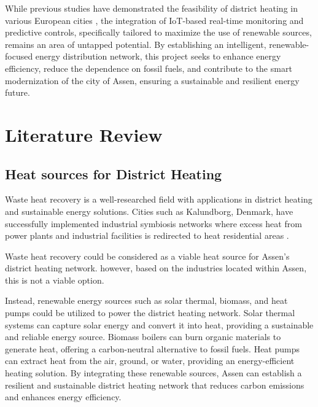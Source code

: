 \documentclass[conference]{IEEEtran}
\begin{document}
While previous studies have demonstrated the feasibility of district heating in various European cities \cite{kalundborg}, the integration of IoT-based real-time monitoring and predictive controls, specifically tailored to maximize the use of renewable sources, remains an area of untapped potential. By establishing an intelligent, renewable-focused energy distribution network, this project seeks to enhance energy efficiency, reduce the dependence on fossil fuels, and contribute to the smart modernization of the city of Assen, ensuring a sustainable and resilient energy future.

\section{Literature Review}
\subsection{Heat sources for District Heating}
Waste heat recovery is a well-researched field with applications in district heating and sustainable energy solutions. Cities such as Kalundborg, Denmark, have successfully implemented industrial symbiosis networks where excess heat from power plants and industrial facilities is redirected to heat residential areas \cite{kalundborg}.

Waste heat recovery could be considered as a viable heat source for Assen's district heating network. however, based on the industries located within Assen\cite{bedrijvenopdekaart_assen}, this is not a viable option.

Instead, renewable energy sources such as solar thermal, biomass, and heat pumps could be utilized to power the district heating network\cite{nationaal_programma_duurzame}. Solar thermal systems can capture solar energy and convert it into heat, providing a sustainable and reliable energy source. Biomass boilers can burn organic materials to generate heat, offering a carbon-neutral alternative to fossil fuels. Heat pumps can extract heat from the air, ground, or water, providing an energy-efficient heating solution. By integrating these renewable sources, Assen can establish a resilient and sustainable district heating network that reduces carbon emissions and enhances energy efficiency.
\end{document}
